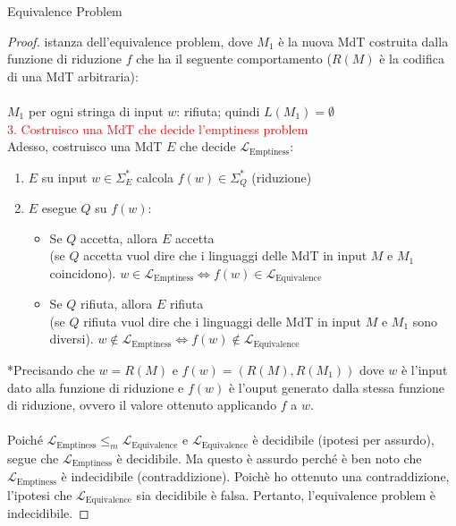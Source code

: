 \documentclass{article}  %
\theoremstyle{definition}
\begin{document}
\begin{theorem}{Equivalence Problem}
\begin{proof}
		{istanza dell'equivalence problem}, dove $M_1$ è la nuova MdT costruita dalla funzione di riduzione $f$ che ha il seguente
		comportamento ($R(M)$ è la codifica di una MdT arbitraria):\\ \\ $M_1$ per ogni stringa di input $w$: rifiuta; quindi $L(M_1)=\emptyset$ \\
		\textcolor{red}{3. Costruisco una MdT che decide l'emptiness problem} \\
		Adesso, costruisco una MdT $E$ che decide $\mathcal{L}_{\text{Emptiness}}$:
		\begin{enumerate}
			\item $E$ su input $w \in \Sigma_E^*$ calcola $f(w) \in \Sigma_Q^*$ (riduzione)
			\item $E$ esegue $Q$ su $f(w)$:
			      \begin{itemize}
				      \item Se $Q$ accetta, allora $E$ accetta \\
				            (se $Q$ accetta vuol dire che i linguaggi delle MdT in input $M$ e $M_1$ coincidono).
				            $w \in \mathcal{L}_{\text{Emptiness}} \iff f(w) \in \mathcal{L}_{\text{Equivalence}}$

				      \item Se $Q$ rifiuta, allora $E$ rifiuta \\
				            (se $Q$ rifiuta vuol dire che i linguaggi delle MdT in input $M$ e $M_1$ sono diversi).
				            $w \notin \mathcal{L}_{\text{Emptiness}} \iff f(w) \notin \mathcal{L}_{\text{Equivalence}}$
			      \end{itemize}
		\end{enumerate}
		*Precisando che $w=R(M)$ e $f(w)=(R(M),R(M_1))$ dove $w$ è l'input dato alla funzione di riduzione e $f(w)$ è l'ouput
		generato dalla stessa funzione di riduzione, ovvero il valore ottenuto applicando $f$ a $w$. \\ \\
		Poiché $\mathcal{L}_{\text{Emptiness}} \leq_m \mathcal{L}_{\text{Equivalence}}$ e $\mathcal{L}_{\text{Equivalence}}$ è decidibile (ipotesi per assurdo), segue
		che $\mathcal{L}_{\text{Emptiness}}$ è decidibile.
		Ma questo è assurdo perché è ben noto che $\mathcal{L}_{\text{Emptiness}}$ è indecidibile (contraddizione). Poichè ho ottenuto una contraddizione, l'ipotesi che
		$\mathcal{L}_{\text{Equivalence}}$ sia decidibile è falsa. Pertanto, l'equivalence problem è indecidibile.
	\end{proof}
\end{theorem}
\end{document}
